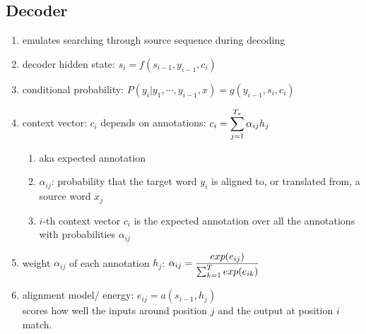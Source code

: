 \subsection{Decoder}

\begin{enumerate}
    \item emulates searching through source sequence during decoding
    \hfill \cite{adv-ml-tech/paper/arxiv.org/1409.0473}

    \item decoder hidden state: $s_i = f(s_{i-1}, y_{i-1}, c_i)$
    \hfill \cite{adv-ml-tech/paper/arxiv.org/1409.0473}

    \item conditional probability: $P(y_i | y_1, \cdots , y_{i-1}, x) = g(y_{i-1}, s_i, c_i)$
    \hfill \cite{adv-ml-tech/paper/arxiv.org/1409.0473}


    \item context vector: $c_i$ depends on annotations:
    $
        c_i
        = \displaystyle\sum_{j=1}^{T_x} \alpha_{ij} h_j
    $
    \hfill \cite{adv-ml-tech/paper/arxiv.org/1409.0473}
    \begin{enumerate}
        \item aka expected annotation
        \hfill \cite{adv-ml-tech/paper/arxiv.org/1409.0473}

        \item $\alpha_{ij}$:  probability that the target word $y_i$ is aligned to, or translated from, a source word $x_j$
        \hfill \cite{adv-ml-tech/paper/arxiv.org/1409.0473}

        \item $i$-th context vector $c_i$ is the expected annotation over all the annotations with probabilities $\alpha_{ij}$
        \hfill \cite{adv-ml-tech/paper/arxiv.org/1409.0473}
    \end{enumerate}



    \item weight $\alpha_{ij}$ of each annotation $h_j$:
    $
        \alpha_{ij}
        = \dfrac{exp(e_{ij})}{\textstyle\sum_{k=1}^T exp(e_{ik})}
    $
    \hfill \cite{adv-ml-tech/paper/arxiv.org/1409.0473}

    \item alignment model/ energy: $e_{ij} = a(s_{i-1}, h_j)$\\
    scores how well the inputs around position $j$ and the output at position $i$ match.
    \hfill \cite{adv-ml-tech/paper/arxiv.org/1409.0473}


\end{enumerate}
